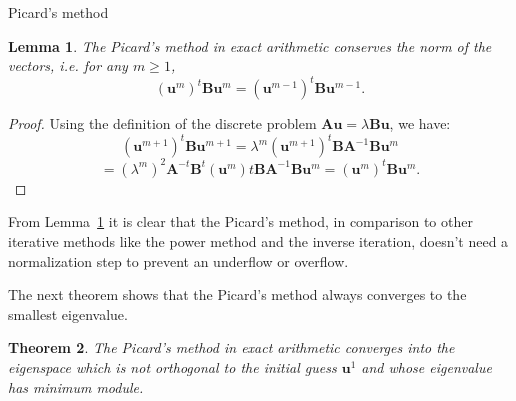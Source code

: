 \documentclass[preprint,12pt]{elsarticle}
\newtheorem{theorem}{Theorem}[section]
\newtheorem{lemma}[theorem]{Lemma}
\begin{document}
\begin{algorithm}[H] \caption{Picard's method} \label{alg:picard} 
\begin{algorithmic}


\REPEAT

\end{algorithmic}
\end{algorithm}

\begin{lemma}\label{lm:picard_b}
The Picard's method in exact arithmetic conserves the norm of the vectors, i.e. for any $m\ge 1$,
$$
(\mathbf{u}^{m})^t\mathbf{B}\mathbf{u}^{m}=(\mathbf{u}^{m-1})^t\mathbf{B}\mathbf{u}^{m-1}.
$$
\end{lemma}

\begin{proof}
Using the definition of the discrete problem $\mathbf{A}\mathbf{u}=\lambda \mathbf{B}\mathbf{u}$, we have:
$$
(\mathbf{u}^{m+1})^t\mathbf{B}\mathbf{u}^{m+1}=\lambda^m(\mathbf{u}^{m+1})^t\mathbf{B}\mathbf{A}^{-1}\mathbf{B}\mathbf{u}^{m}
$$
$$
=(\lambda^m)^2\mathbf{A}^{-t}\mathbf{B}^t(\mathbf{u}^{m})t\mathbf{B}\mathbf{A}^{-1}\mathbf{B}\mathbf{u}^{m}
=(\mathbf{u}^{m})^t\mathbf{B}\mathbf{u}^{m}.
$$
\end{proof}

From Lemma~\ref{lm:picard_b} it is clear that the Picard's method, in comparison to other iterative methods like the power method and the inverse iteration, doesn't need a normalization step to prevent an underflow or overflow.

The next theorem shows that the Picard's method always converges to the smallest eigenvalue.

\begin{theorem}\label{th:picard_conv}
The Picard's method in exact arithmetic converges into the eigenspace which is not orthogonal to the initial guess $\mathbf{u}^1$ and whose eigenvalue has minimum module.
\end{theorem}
\end{document}
